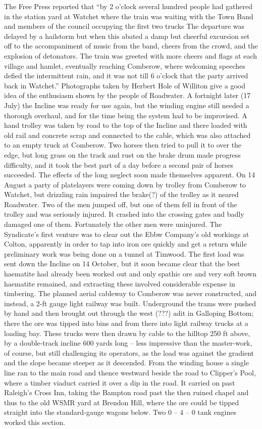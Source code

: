 \documentclass[10pt,a4paper]{article}
\begin{document}
   The Free Press reported that “by 2 o’clock several hundred people had gathered in the station yard at Watchet where the train was waiting with the Town Band and members of the council occupying the first two trucks    The departure was delayed by a hailstorm but when this abated a damp but cheerful excursion set off to the accompaniment of music from the band, cheers from the crowd, and the explosion of detonators. The train was greeted with more cheers and flags at each village and hamlet, eventually reaching Comberow, where welcoming speeches defied the intermittent rain, and it was not till 6 o’clock that the party arrived back in Watchet.”  Photographs taken by Herbert  Hole of Williton  give a good idea of the enthusiasm shown by the people of Roadwater.  
  A fortnight later (17 July) the Incline was ready for use again, but the winding engine still needed a thorough overhaul, and for the time being the system had to be improvised. A hand trolley was taken by road to the top of the Incline and there loaded with old rail and concrete scrap and connected to the cable, which was also attached to an empty truck at Comberow. Two horses then tried to pull it to over the edge, but long grass on the track and rust on the brake drum made progress difficulty, and it took the best part of a day before a second pair of horses succeeded.
  The effects of the long neglect soon made themselves apparent. On 14 August a party of platelayers were coming down by trolley from Comberow to Watchet, but drizzling rain impaired the brake(?) of the trolley as it neared Roadwater. Two of the men jumped off, but one of them fell in front of the trolley and was seriously injured. It crashed into the crossing gates and badly damaged one of them. Fortunately the other men were uninjured. 
   The Syndicate’s first venture was to clear out the Ebbw Company’s old workings at Colton, apparently in order to tap into iron ore quickly and get a return while preliminary work was being done on a tunnel at Timwood. The first load was sent down the Incline on 14 October, but it soon became clear that the best haematite had already been worked out and only spathic ore and very soft brown haematite remained, and extracting these involved considerable expense in timbering.  The planned aerial cableway to Comberow was never constructed, and instead, a 2-ft gauge light railway was built. Underground the trams were pushed by hand and then brought out through the west (???) adit in Galloping Bottom; there the ore was tipped into bins and from there into light railway trucks at a loading bay. These trucks were then drawn by cable to the hilltop 250 ft above, by a double-track incline 600 yards long – less impressive than the master-work, of course, but still challenging its operators, as the load was against the gradient and the slope became steeper as it descended.  From the winding house a single line ran to the main road and thence westward beside the road to Clipper’s Pool, where a timber viaduct carried it over a dip in the road. It carried on past Raleigh’s Cross Inn, taking the Bampton road past the then ruined chapel and thus to the old WSMR yard at Brendon Hill, where the ore could be tipped straight into the standard-gauge wagons below. Two 0 – 4 – 0 tank engines worked this section.
\end{document}
